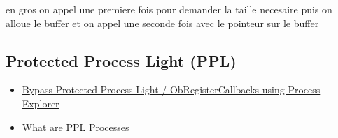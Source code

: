 en gros on appel une premiere fois pour demander la taille necesaire puis on alloue le buffer et on appel une seconde fois avec le pointeur sur le buffer


\subsection{Protected Process Light (PPL)}

\begin{itemize}
    \item \href{https://waawaa.github.io/en/Bypass-PPL-Using-Process-Explorer/}{Bypass Protected Process Light / ObRegisterCallbacks using Process Explorer }
    \item \href{https://itm4n.github.io/lsass-runasppl/#what-are-ppl-processes}{What are PPL Processes}
\end{itemize}